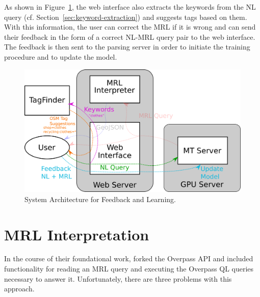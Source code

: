 As shown in Figure~\ref{fig:learning-architecture}, the web interface also
extracts the keywords from the NL query (cf.
Section~\ref{sec:keyword-extraction}) and suggests tags based on them. With this
information, the user can correct the MRL if it is wrong and can send their
feedback in the form of a correct NL-MRL query pair to the web interface. The
feedback is then sent to the parsing server in order to initiate the training
procedure and to update the model.

\begin{figure}[h]
  \centering
  \includegraphics[width=\textwidth]{fig/learning_architecture.png}
  \caption[Feedback \& learning architecture]{System Architecture for Feedback
    and Learning.}
  \label{fig:learning-architecture}
\end{figure}

\section{MRL Interpretation}
\label{sec:mrl-interpretation}

In the course of their foundational work, \textcite{haas-2016}
forked the Overpass API and included
functionality for reading an MRL query and executing the Overpass QL queries
necessary to answer it. Unfortunately, there are three problems with this
approach.

